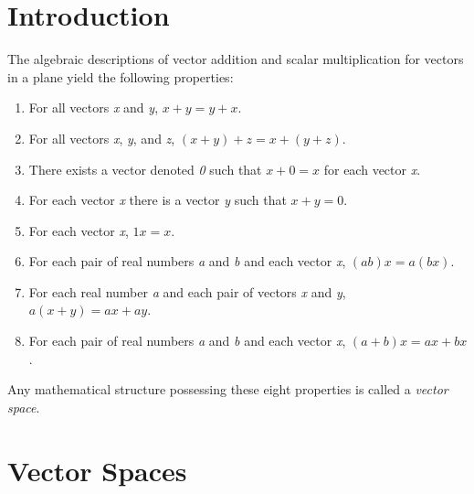 \documentclass{article}
\begin{document}
\section{Introduction}

The algebraic descriptions of vector addition and scalar multiplication for vectors in a plane yield the following properties:
\begin{enumerate}
	\item For all vectors \textit{x} and \textit{y}, $x + y = y + x$.
	\item For all vectors \textit{x}, \textit{y}, and \textit{z}, $(x + y) + z = x + (y + z)$.
	\item There exists a vector denoted \textit{0} such that $x + \textit{0} = x$ for each vector \textit{x}.
	\item For each vector \textit{x} there is a vector \textit{y} such that $x + y = \textit{0}$.
	\item For each vector \textit{x}, $1x = x$.
	\item For each pair of real numbers \textit{a} and \textit{b} and each vector \textit{x}, $(ab)x = a(bx)$.
	\item For each real number \textit{a} and each pair of vectors \textit{x} and \textit{y}, $a(x + y) = ax + ay$.
	\item For each pair of real numbers \textit{a} and \textit{b} and each vector \textit{x}, $(a + b)x = ax + bx$.	
\end{enumerate}

Any mathematical structure possessing these eight properties is called a \textit{vector space}.

\section{Vector Spaces}
\end{document}
